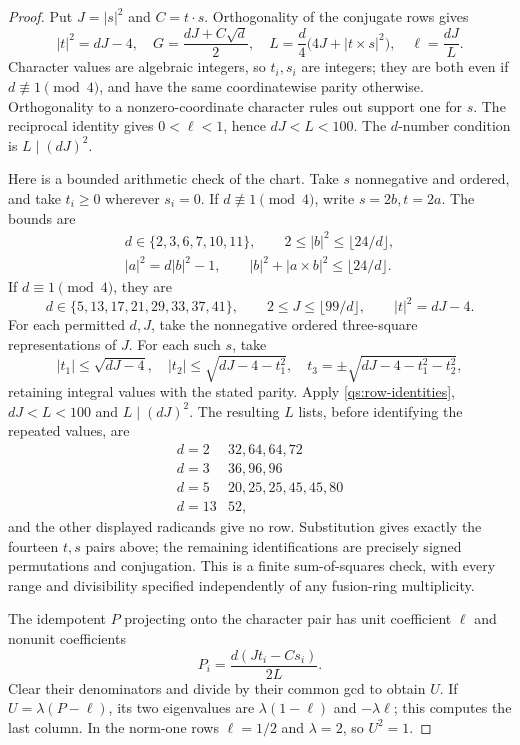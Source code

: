 \documentclass[11pt,a4paper]{article}
\theoremstyle{definition}\newtheorem{definition}[theorem]{Definition}
\theoremstyle{remark}\newtheorem{remark}[theorem]{Remark}
\numberwithin{equation}{section}
\begin{document}
\begin{proof}
Put $J=|s|^2$ and $C=t\cdot s$. Orthogonality of the conjugate rows gives
\begin{equation}\label{qs:row-identities}
 |t|^2=dJ-4,\quad
 G=\frac{dJ+C\sqrt d}{2},\quad
 L=\frac d4\bigl(4J+|t\times s|^2\bigr),\quad
 \ell=\frac{dJ}{L}.
\end{equation}
Character values are algebraic integers, so $t_i,s_i$ are integers;
they are both even if $d\not\equiv1\pmod4$, and have the same
coordinatewise parity otherwise. Orthogonality to a nonzero-coordinate
character rules out support one for $s$. The reciprocal identity gives
$0<\ell<1$, hence $dJ<L<100$. The $d$-number condition is
$L\mid(dJ)^2$.

Here is a bounded arithmetic check of the chart. Take $s$ nonnegative
and ordered, and take $t_i\ge0$ wherever $s_i=0$.
If $d\not\equiv1\pmod4$, write $s=2b,t=2a$. The bounds are
\[
\begin{gathered}
d\in\{2,3,6,7,10,11\},\qquad
2\le|b|^2\le\lfloor24/d\rfloor,\\
|a|^2=d|b|^2-1,\qquad
|b|^2+|a\times b|^2\le\lfloor24/d\rfloor.
\end{gathered}
\]
If $d\equiv1\pmod4$, they are
\[
 d\in\{5,13,17,21,29,33,37,41\},\qquad
 2\le J\le\lfloor99/d\rfloor,
 \qquad |t|^2=dJ-4.
\]
For each permitted $d,J$, take the nonnegative ordered three-square
representations of $J$. For each such $s$, take
\[
 |t_1|\le\sqrt{dJ-4},\quad
 |t_2|\le\sqrt{dJ-4-t_1^2},\quad
 t_3=\pm\sqrt{dJ-4-t_1^2-t_2^2},
\]
retaining integral values with the stated parity. Apply
\eqref{qs:row-identities}, $dJ<L<100$ and $L\mid(dJ)^2$.
The resulting $L$ lists, before identifying the repeated values, are
\[
\begin{array}{c|l}
d=2&32,64,64,72\\
d=3&36,96,96\\
d=5&20,25,25,45,45,80\\
d=13&52,
\end{array}
\]
and the other displayed radicands give no row. Substitution gives
exactly the fourteen $t,s$ pairs above; the remaining identifications are precisely signed permutations
and conjugation. This is a finite sum-of-squares check,
with every range and divisibility specified independently of any
fusion-ring multiplicity.

The idempotent $P$ projecting onto the character pair has unit coefficient
$\ell$ and nonunit coefficients
\[
 P_i=\frac{d(Jt_i-Cs_i)}{2L}.
\]
Clear their denominators and divide by their common gcd to obtain $U$.
If $U=\lambda(P-\ell)$, its two eigenvalues are
$\lambda(1-\ell)$ and $-\lambda\ell$; this computes the last column.
In the norm-one rows $\ell=1/2$ and $\lambda=2$, so $U^2=1$.
\end{proof}
\end{document}
